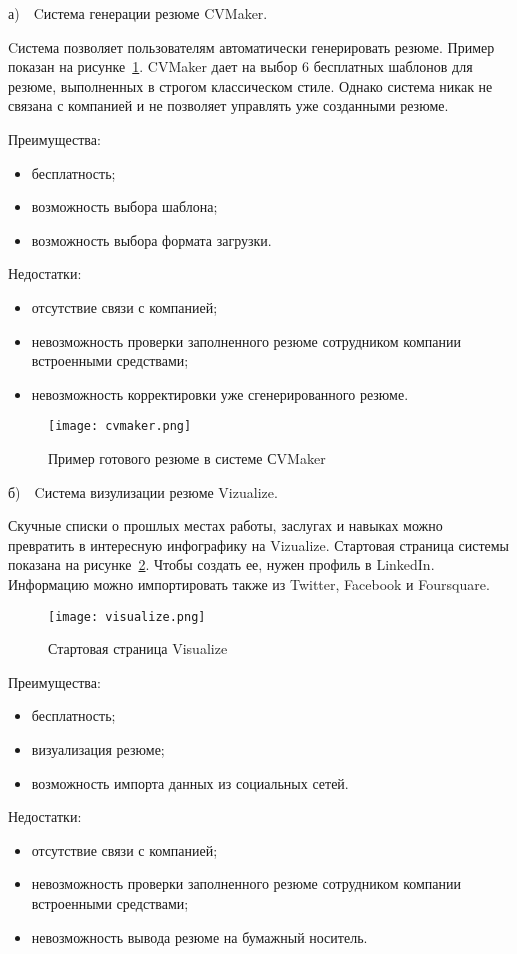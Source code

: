 а)~~Cистема генерации резюме CVMaker.

Cистема позволяет пользователям автоматически генерировать резюме. Пример показан на рисунке~\ref{fig:analysis:analogues:cvmaker}.
CVMaker дает на выбор 6 бесплатных шаблонов для резюме, выполненных в строгом классическом стиле. Однако система никак
не связана с компанией и не позволяет управлять уже созданными резюме.

Преимущества:
\begin{itemize}
	\item бесплатность;
	\item возможность выбора шаблона;
	\item возможность выбора формата загрузки.
\end{itemize}

Недостатки:
\begin{itemize}
	\item отсутствие связи с компанией;
	\item невозможность проверки заполненного резюме сотрудником компании встроенными средствами;
	\item невозможность корректировки уже сгенерированного резюме.
\end{itemize}

\begin{figure}[!t]
	\centering
	\texttt{[image: cvmaker.png]} 
	\caption{Пример готового резюме в системе СVMaker}
	\label{fig:analysis:analogues:cvmaker}
\end{figure}

б)~~Cистема визулизации резюме Vizualize.

Скучные списки о прошлых местах работы, заслугах и навыках можно превратить в интересную инфографику на
Vizualize. Стартовая страница системы показана на рисунке~\ref{fig:analysis:analogues:visualize}. Чтобы создать ее, нужен профиль в LinkedIn. Информацию можно
импортировать также из Twitter, Facebook и Foursquare.

\begin{figure}[!t]
	\centering
	\texttt{[image: visualize.png]} 
	\caption{Стартовая страница Visualize}
	\label{fig:analysis:analogues:visualize}
\end{figure}

Преимущества:
\begin{itemize}
	\item бесплатность;
	\item визуализация резюме;
	\item возможность импорта данных из социальных сетей.
\end{itemize}

Недостатки:
\begin{itemize}
	\item отсутствие связи с компанией;
	\item невозможность проверки заполненного резюме сотрудником компании встроенными средствами;
	\item невозможность вывода резюме на бумажный носитель.
\end{itemize}
